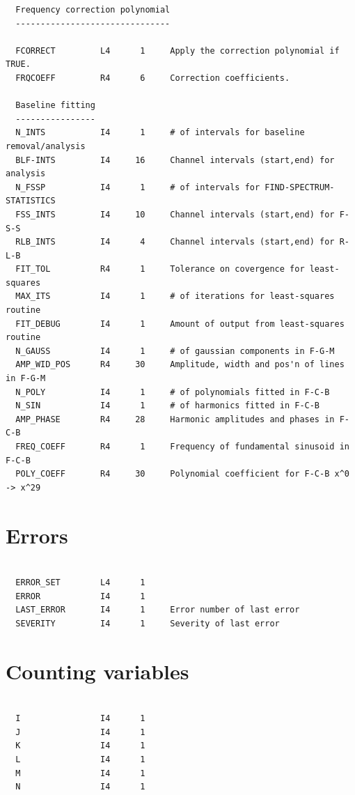 \documentclass[11pt,twoside]{report}
\begin{document}
\begin{verbatim}
  Frequency correction polynomial
  -------------------------------

  FCORRECT         L4      1     Apply the correction polynomial if TRUE.
  FRQCOEFF         R4      6     Correction coefficients.

  Baseline fitting
  ----------------
  N_INTS           I4      1     # of intervals for baseline removal/analysis
  BLF-INTS         I4     16     Channel intervals (start,end) for analysis
  N_FSSP           I4      1     # of intervals for FIND-SPECTRUM-STATISTICS
  FSS_INTS         I4     10     Channel intervals (start,end) for F-S-S
  RLB_INTS         I4      4     Channel intervals (start,end) for R-L-B
  FIT_TOL          R4      1     Tolerance on covergence for least-squares
  MAX_ITS          I4      1     # of iterations for least-squares routine
  FIT_DEBUG        I4      1     Amount of output from least-squares routine
  N_GAUSS          I4      1     # of gaussian components in F-G-M
  AMP_WID_POS      R4     30     Amplitude, width and pos'n of lines in F-G-M
  N_POLY           I4      1     # of polynomials fitted in F-C-B
  N_SIN            I4      1     # of harmonics fitted in F-C-B
  AMP_PHASE        R4     28     Harmonic amplitudes and phases in F-C-B
  FREQ_COEFF       R4      1     Frequency of fundamental sinusoid in F-C-B
  POLY_COEFF       R4     30     Polynomial coefficient for F-C-B x^0 -> x^29

\end{verbatim}
\section{Errors}
\begin{verbatim}

  ERROR_SET        L4      1     
  ERROR            I4      1  
  LAST_ERROR       I4      1     Error number of last error
  SEVERITY         I4      1     Severity of last error

\end{verbatim}
\section{Counting variables}
\begin{verbatim}

  I                I4      1
  J                I4      1
  K                I4      1
  L                I4      1
  M                I4      1
  N                I4      1

\end{verbatim}
\end{document}
